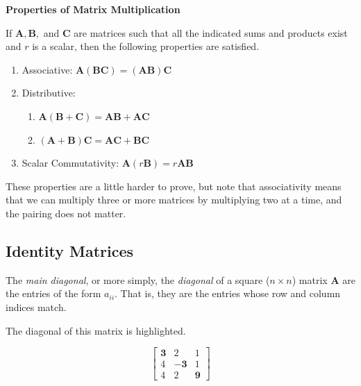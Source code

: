 \documentclass[
]{book}
\theoremstyle{definition}
\theoremstyle{definition}
\theoremstyle{definition}
\theoremstyle{definition}
\theoremstyle{remark}
\begin{document}
\begin{propbox}

\textbf{Properties of Matrix Multiplication}

If \(\mathbf{A},\mathbf{B},\) and \(\mathbf{C}\) are matrices such that all the indicated sums and products exist and \(r\) is a scalar, then the following properties are satisfied.

\begin{enumerate}
\def\labelenumi{\arabic{enumi}.}
\item
  Associative: \(\mathbf{A}(\mathbf{BC})=(\mathbf{AB})\mathbf{C}\)
\item
  Distributive:

  \begin{enumerate}
  \def\labelenumii{\alph{enumii}.}
  \item
    \(\mathbf{A}(\mathbf{B}+\mathbf{C})=\mathbf{AB}+\mathbf{AC}\)
  \item
    \((\mathbf{A}+\mathbf{B})\mathbf{C}=\mathbf{AC}+\mathbf{BC}\)
  \end{enumerate}
\item
  Scalar Commutativity: \(\mathbf{A}(r\mathbf{B})=r\mathbf{A}\mathbf{B}\)
\end{enumerate}

\end{propbox}

These properties are a little harder to prove, but note that associativity means that we can multiply three or more matrices by multiplying two at a time, and the pairing does not matter.

\subsection*{Identity Matrices}\label{identity-matrices}

The \emph{main diagonal}, or more simply, the \emph{diagonal} of a square (\(n\times n\)) matrix \(\mathbf{A}\) are the entries of the form \(a_{ii}\). That is, they are the entries whose row and column indices match.

The diagonal of this matrix is highlighted.

\[\begin{bmatrix} \mathbf{3} & 2 & 1\\ 4 & \mathbf{-3} & 1\\4 & 2 & \mathbf{9}\end{bmatrix}\]
\end{document}
